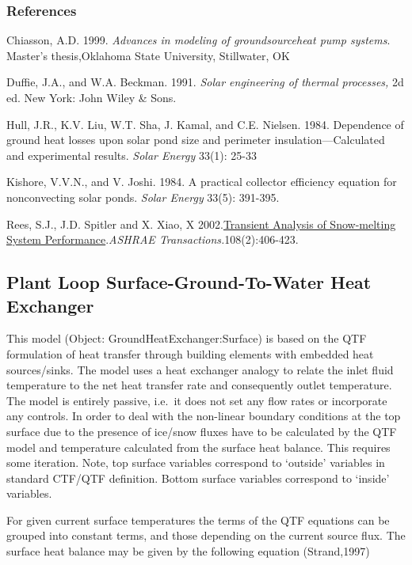 \subsubsection{References}\label{references-4-002}

Chiasson, A.D. 1999. \emph{Advances in modeling of groundsourceheat pump systems}. Master's thesis,Oklahoma State University, Stillwater, OK

Duffie, J.A., and W.A. Beckman. 1991. \emph{Solar engineering of thermal processes,} 2d ed. New York: John Wiley \& Sons.

Hull, J.R., K.V. Liu, W.T. Sha, J. Kamal, and C.E. Nielsen. 1984. Dependence of ground heat losses upon solar pond size and perimeter insulation---Calculated and experimental results. \emph{Solar Energy} 33(1): 25-33

Kishore, V.V.N., and V. Joshi. 1984. A practical collector efficiency equation for nonconvecting solar ponds. \emph{Solar Energy} 33(5): 391-395.

Rees, S.J., J.D. Spitler and X. Xiao, X 2002.\href{http://www.hvac.okstate.edu/pdfs/Rees_Spitler_Xiao_02.pdf}{Transient Analysis of Snow-melting System Performance}.\emph{ASHRAE Transactions.}108(2):406-423.

\subsection{Plant Loop Surface-Ground-To-Water Heat Exchanger}\label{plant-loop-surface-ground-to-water-heat-exchanger}

This model (Object: GroundHeatExchanger:Surface) is based on the QTF formulation of heat transfer through building elements with embedded heat sources/sinks. The model uses a heat exchanger analogy to relate the inlet fluid temperature to the net heat transfer rate and consequently outlet temperature. The model is entirely passive, i.e.~it does not set any flow rates or incorporate any controls. In order to deal with the non-linear boundary conditions at the top surface due to the presence of ice/snow fluxes have to be calculated by the QTF model and temperature calculated from the surface heat balance. This requires some iteration. Note, top surface variables correspond to `outside' variables in standard CTF/QTF definition. Bottom surface variables correspond to `inside' variables.

For given current surface temperatures the terms of the QTF equations can be grouped into constant terms, and those depending on the current source flux. The surface heat balance may be given by the following equation (Strand,1997)

